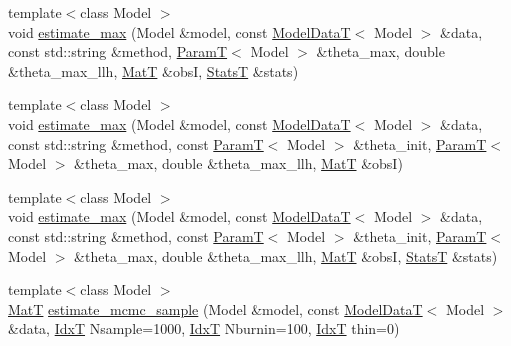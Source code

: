 \begin{DoxyCompactItemize}
\item 
{\footnotesize template$<$class Model $>$ }\\void \hyperlink{namespacemappel_1_1methods_aee25050c1c9f8cf29d38d8c47d593a3e}{estimate\+\_\+max} (Model \&model, const \hyperlink{namespacemappel_a97f050df953605381ae9c901c3b125f1}{Model\+DataT}$<$ Model $>$ \&data, const std\+::string \&method, \hyperlink{namespacemappel_a667925cb0d6c0e49f2f035cc5a9a6857}{ParamT}$<$ Model $>$ \&theta\+\_\+max, double \&theta\+\_\+max\+\_\+llh, \hyperlink{namespacemappel_a7091ab87c528041f7e2027195fad8915}{MatT} \&obsI, \hyperlink{namespacemappel_a04ab395b0cf82c4ce68a36b2212649a5}{StatsT} \&stats)
\item 
{\footnotesize template$<$class Model $>$ }\\void \hyperlink{namespacemappel_1_1methods_a8db06e0816204cdca735bdf498e2bae2}{estimate\+\_\+max} (Model \&model, const \hyperlink{namespacemappel_a97f050df953605381ae9c901c3b125f1}{Model\+DataT}$<$ Model $>$ \&data, const std\+::string \&method, const \hyperlink{namespacemappel_a667925cb0d6c0e49f2f035cc5a9a6857}{ParamT}$<$ Model $>$ \&theta\+\_\+init, \hyperlink{namespacemappel_a667925cb0d6c0e49f2f035cc5a9a6857}{ParamT}$<$ Model $>$ \&theta\+\_\+max, double \&theta\+\_\+max\+\_\+llh, \hyperlink{namespacemappel_a7091ab87c528041f7e2027195fad8915}{MatT} \&obsI)
\item 
{\footnotesize template$<$class Model $>$ }\\void \hyperlink{namespacemappel_1_1methods_a336e74435f33240ea8251bfc21dbe279}{estimate\+\_\+max} (Model \&model, const \hyperlink{namespacemappel_a97f050df953605381ae9c901c3b125f1}{Model\+DataT}$<$ Model $>$ \&data, const std\+::string \&method, const \hyperlink{namespacemappel_a667925cb0d6c0e49f2f035cc5a9a6857}{ParamT}$<$ Model $>$ \&theta\+\_\+init, \hyperlink{namespacemappel_a667925cb0d6c0e49f2f035cc5a9a6857}{ParamT}$<$ Model $>$ \&theta\+\_\+max, double \&theta\+\_\+max\+\_\+llh, \hyperlink{namespacemappel_a7091ab87c528041f7e2027195fad8915}{MatT} \&obsI, \hyperlink{namespacemappel_a04ab395b0cf82c4ce68a36b2212649a5}{StatsT} \&stats)
\item 
{\footnotesize template$<$class Model $>$ }\\\hyperlink{namespacemappel_a7091ab87c528041f7e2027195fad8915}{MatT} \hyperlink{namespacemappel_1_1methods_a8bec3dcf3172f17383eb5f6693e7e956}{estimate\+\_\+mcmc\+\_\+sample} (Model \&model, const \hyperlink{namespacemappel_a97f050df953605381ae9c901c3b125f1}{Model\+DataT}$<$ Model $>$ \&data, \hyperlink{namespacemappel_ab17ec0f30b61ece292439d7ece81d3a8}{IdxT} Nsample=1000, \hyperlink{namespacemappel_ab17ec0f30b61ece292439d7ece81d3a8}{IdxT} Nburnin=100, \hyperlink{namespacemappel_ab17ec0f30b61ece292439d7ece81d3a8}{IdxT} thin=0)

\end{DoxyCompactItemize}
